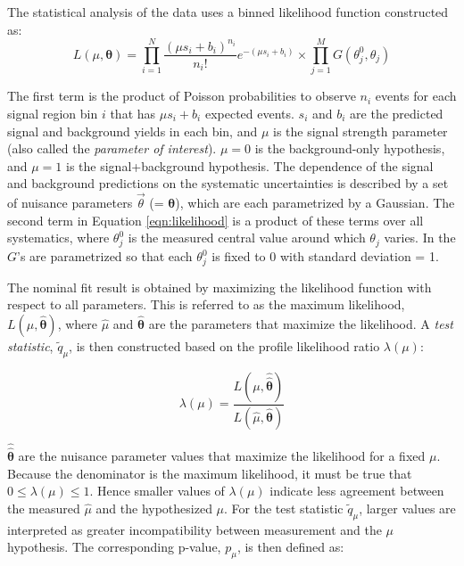 The statistical analysis of the data uses a binned likelihood function constructed as:
\begin{equation}
L(\mu,\boldsymbol{\theta}) = \prod_{i=1}^N \frac{(\mu s_i + b_i)^{n_i}}{n_i !} e^{-(\mu s_i + b_i)} \times \prod_{j=1}^M G(\theta_j^0, \theta_j)
\label{eqn:likelihood}
\end{equation}

\noindent The first term is the product of Poisson probabilities to observe $n_i$ events for each signal region bin $i$ that has $\mu s_i + b_i$ expected events. $s_i$ and $b_i$ are the predicted signal and background yields in each bin, and $\mu$ is the signal strength parameter (also called the \textit{parameter of interest}). $\mu=0$ is the background-only hypothesis, and $\mu=1$ is the signal+background hypothesis. The dependence of the signal and background predictions on the systematic uncertainties is described by a set of nuisance parameters $\vec{\theta}$ (= $\boldsymbol{\theta}$), which are each parametrized by a Gaussian. The second term in Equation \ref{eqn:likelihood} is a product of these terms over all systematics, where $\theta_j^0$ is the measured central value around which $\theta_j$ varies. In \histfitter the $G$'s are parametrized so that each $\theta_j^0$ is fixed to 0 with standard deviation = 1.

The nominal fit result is obtained by maximizing the likelihood function with respect to all parameters. This is referred to as the maximum likelihood, $L(\hat{\mu}, \hat{\boldsymbol{\theta}})$, where $\hat\mu$ and $\hat{\boldsymbol{\theta}}$ are the parameters that maximize the likelihood. A \textit{test statistic}, $\tilde q_\mu$, is then constructed based on the profile likelihood ratio $\lambda(\mu)$:

\begin{equation}
\lambda(\mu) = \frac{L(\mu, \hat{\hat{\boldsymbol{\theta}}})}{L(\hat{\mu}, \hat{\boldsymbol{\theta}})}
\label{eqn:proflike}
\end{equation}

\noindent $\hat{\hat{\boldsymbol{\theta}}}$ are the nuisance parameter values that maximize the likelihood for a fixed $\mu$. Because the denominator is the maximum likelihood, it must be true that $0 \leq \lambda(\mu) \leq 1$. Hence smaller values of $\lambda(\mu)$ indicate less agreement between the measured $\hat{\mu}$ and the hypothesized $\mu$. For the test statistic $\tilde q_\mu$, larger values are interpreted as greater incompatibility between measurement and the $\mu$ hypothesis. The corresponding p-value, $p_\mu$, is then defined as:

